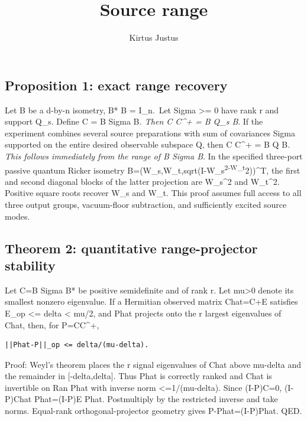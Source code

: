 \documentclass[
  10pt,
  a4paper,
]{article}
\title{Source range}
\author{Kirtus Justus}
\date{}
\begin{document}
\maketitle

\subsection{Proposition 1: exact range recovery}\label{proposition-1-exact-range-recovery}

Let B be a d-by-n isometry, B* B = I\_n.~Let Sigma \textgreater= 0 have rank r and support Q\_s. Define C = B Sigma B\emph{. Then C C\^{}+ = B Q\_s B}. If the experiment combines several source preparations with sum of covariances Sigma supported on the entire desired observable subspace Q, then C C\^{}+ = B Q B\emph{. This follows immediately from the range of B Sigma B}. In the specified three-port passive quantum Ricker isometry B=(W\_s,W\_t,sqrt(I-W\_s\textsuperscript{2-W\_t}2))\^{}T, the first and second diagonal blocks of the latter projection are W\_s\^{}2 and W\_t\^{}2. Positive square roots recover W\_s and W\_t. This proof assumes full access to all three output groups, vacuum-floor subtraction, and sufficiently excited source modes.

\subsection{Theorem 2: quantitative range-projector stability}\label{theorem-2-quantitative-range-projector-stability}

Let C=B Sigma B* be positive semidefinite and of rank r. Let mu\textgreater0 denote its smallest nonzero eigenvalue. If a Hermitian observed matrix Chat=C+E satisfies \textbar\textbar E\textbar\textbar\_op \textless= delta \textless{} mu/2, and Phat projects onto the r largest eigenvalues of Chat, then, for P=CC\^{}+,

\begin{verbatim}
||Phat-P||_op <= delta/(mu-delta).
\end{verbatim}

Proof: Weyl's theorem places the r signal eigenvalues of Chat above mu-delta and the remainder in {[}-delta,delta{]}. Thus Phat is correctly ranked and Chat is invertible on Ran Phat with inverse norm \textless=1/(mu-delta). Since (I-P)C=0, (I-P)Chat Phat=(I-P)E Phat. Postmultiply by the restricted inverse and take norms. Equal-rank orthogonal-projector geometry gives \textbar\textbar P-Phat\textbar\textbar=\textbar\textbar(I-P)Phat\textbar\textbar. QED.
\end{document}
